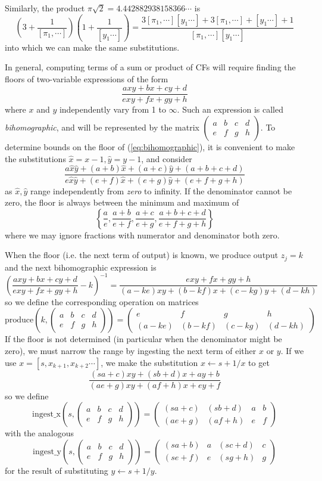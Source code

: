 \documentclass[11pt, oneside]{amsart}   	%
\newcommand{\bihomographic}[8]{\left(\begin{smallmatrix}#1&#2&#3&#4\\#5&#6&#7&#8\end{smallmatrix}\right)}
\newcommand{\abcd}{\left(
\begin{smallmatrix} 
a & b & c & d\\ 
e & f & g & h
\end{smallmatrix}
\right)}
\renewcommand{\:}{\negthickspace:\negthickspace}
\begin{document}
Similarly, the product $\pi\sqrt{2}=4.442882938158366\cdots$ is
\begin{equation*}
(3 + \frac{1}{[\pi_1,\cdots]})(1 + \frac{1}{[y_1\cdots]}) 
  = \frac{ 3[\pi_1,\cdots][y_1\cdots] + 3[\pi_1,\cdots] + [y_1\cdots] +1 }{[\pi_1,\cdots][y_1\cdots] }
\end{equation*}
into which we can make the same substitutions. 

In general, computing terms of a sum or product of CFs will require finding the floors of two-variable expressions of the form
\begin{equation}\label{eq:bihomographic}
\frac{axy + bx + cy + d}{exy + fx + gy + h}
\end{equation}
where $x$ and $y$ independently vary from 1 to $\infty$. Such an expression is called \emph{bihomographic}, and will be
represented by the matrix $\abcd$. To determine bounds on the floor of (\ref{eq:bihomographic}), it is convenient to make the
substitutions $\hat{x} = x-1, \hat{y} = y-1$, and consider
\[
\frac{a\hat{x}\hat{y} + (a+b)\hat{x} + (a+c)\hat{y} + (a+b+c+d)}{e\hat{x}\hat{y} + (e+f)\hat{x} + (e+g)\hat{y} + (e+f+g+h)}
\]
as $\hat{x}, \hat{y}$ range independently from \emph{zero} to infinity. If the denominator cannot be zero, the floor is always
between the minimum and maximum of
\[
\left\{ \frac{a}{e},\frac{a+b}{e+f},\frac{a+c}{e+g},\frac{a+b+c+d}{e+f+g+h} \right\}
\]
where we may ignore fractions with numerator and denominator both zero.

When the floor (i.e. the next term of output) is known, we produce output $z_j=k$ and the next bihomographic expression is
\[
\left(\frac{axy + bx + cy + d}{exy + fx + gy + h} - k\right)^{-1} = \frac{exy + fx + gy + h}{(a-ke)xy + (b-kf)x + (c-kg)y + (d-kh)}
\]
so we define the corresponding operation on matrices
\[
\mbox{produce}(k, \abcd) = \bihomographic{e}{f}{g}{h}{(a-ke)}{(b-kf)}{(c-kg)}{(d-kh)}
\]
 If the floor is not determined (in particular when the denominator might be zero), we must narrow the range by ingesting the next term of either $x$ or $y$.
 If we use $x = [s,x_{k+1},x_{k+2}\cdots]$, we make the substitution $x \leftarrow s + 1/x$ to get
\[
\frac{(sa+c)xy + (sb+d)x + ay + b}{(ae+g)xy + (af+h)x + ey + f}
\]
so we define
\[
\mbox{ingest\_x}(s, \abcd) = \bihomographic{(sa+c)}{(sb+d)}{a}{b} {(ae+g)}{(af+h)}{e}{f}
\]
with the analogous 
\[
\mbox{ingest\_y}(s, \abcd) = \bihomographic{(sa+b)}{a}{(sc+d)}{c}{(se+f)}{e}{(sg+h)}{g}
\]
for the result of substituting $y \leftarrow s + 1/y$.
\end{document}
